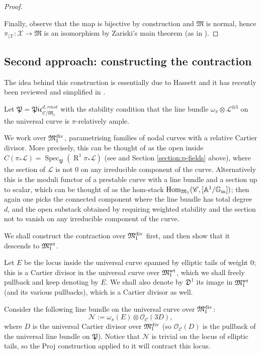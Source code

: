 \documentclass[11pt]{amsart}
\renewcommand{\to}{\rightarrow}
\newcommand{\Aaff}{\mathbb A}
\newcommand{\cC}{\mathcal C}
\newcommand{\MM}{\mathfrak M}
\newcommand{\pP}{\mathfrak P}
\newcommand{\R}{\operatorname{R}}
\newcommand{\Gm}{\mathbb{G}_{\rm{m}}}
\newcommand{\Spec}{\operatorname{Spec}}
\newcommand{\Hom}{\operatorname{Hom}}
\theoremstyle{plain}
\theoremstyle{definition}
\begin{document}
\begin{proof}
\begin{enumerate}
\end{enumerate}
Finally, observe that the map is bijective by construction and $\mathfrak M$ is normal, hence $\pi_{|\mathcal X}\colon\mathcal X\to \mathfrak M$ is an isomorphism by Zariski's main theorem (as in \cite[\href{http://stacks.math.columbia.edu/tag/082I}{Tag 082I}]{stacks-project}).
 \end{proof}
 
\subsection{Second approach: constructing the contraction}

The idea behind this construction is essentially due to Hassett \cite[\S2]{HassettHyeon} and it has recently been reviewed and simplified in \cite[\S3.7]{RSPW}.

Let $\mathfrak{P}=\mathfrak{Pic}^{d,rm{st}}_{\cC/\MM_1}$ with the stability condition that the line bundle $\omega_\pi\otimes \mathcal L^{\otimes 3}$ on the universal curve is $\pi$-relatively ample. 

We work over $\MM_1^{\rm{div}}$, parametrising families of nodal curves with a relative Cartier divisor. More precisely, this can be thought of as the open inside $C(\pi_*\mathcal L)=\Spec_\pP(\R^1\pi_*\mathcal L)$ (see \cite{CLpfields} and Section \ref{section:p-fields} above), where the section of $\mathcal L$ is not $0$ on any irreducible component of the curve. Alternatively this is the moduli functor of a prestable curve with a line bundle and a section up to scalar, which can be thought of as the hom-stack $\Hom_{\MM_1}(\mathcal C,[\Aaff^1/\Gm])$; then again one picks the connected component where the line bundle has total degree $d$, and the open substack obtained by requiring weighted stability and the section not to vanish on any irreducible component of the curve.

We shall construct the contraction over $\MM_1^{\rm{div}}$ first, and then show that it descends to $\MM_1^{\rm{wt}}$.

Let $E$ be the locus inside the universal curve spanned by elliptic tails of weight $0$; this is a Cartier divisor in the universal curve over $\MM^{\rm{wt}}_1$, which we shall freely pullback and keep denoting by $E$. We shall also denote by $\mathfrak D^1$ its image in $\MM^{\rm{wt}}_1$ (and its various pullbacks), which is a Cartier divisor as well.

Consider the following line bundle on the universal curve over $\MM_1^{\rm{div}}$: 
\begin{equation}\label{eq:linebundlecontraction}
\mathcal N:=\omega_{\pi}(E)\otimes\mathcal O_{\cC}(3D),
\end{equation} where $D$ is the universal Cartier divisor over $\MM_1^{\rm{div}}$ (so $\mathcal O_{\cC}(D)$ is the pullback of the universal line bundle on $\pP$).
Notice that $\mathcal N$ is trivial on the locus of elliptic tails, so the Proj construction applied to it will contract this locus.
\end{document}
